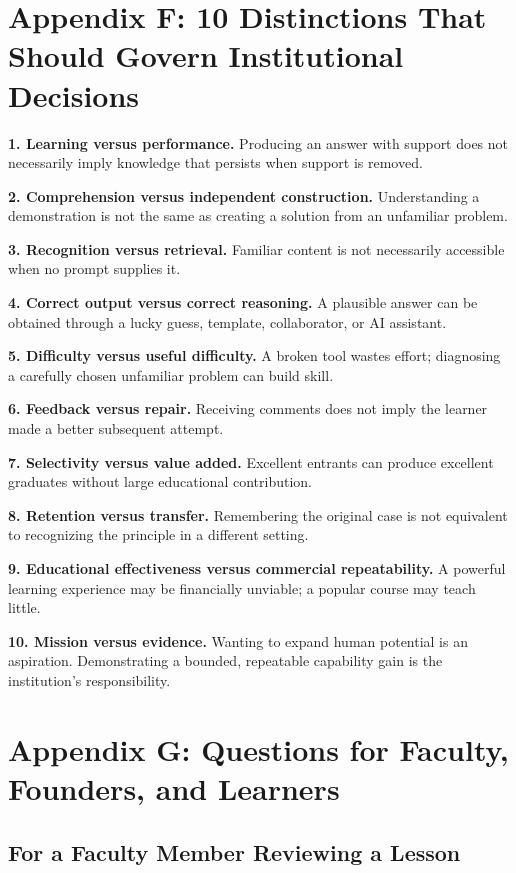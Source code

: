 \section*{Appendix F: 10 Distinctions That Should Govern Institutional Decisions}

\textbf{1. Learning versus performance.} Producing an answer with support does not necessarily imply knowledge that persists when support is removed.

\textbf{2. Comprehension versus independent construction.} Understanding a demonstration is not the same as creating a solution from an unfamiliar problem.

\textbf{3. Recognition versus retrieval.} Familiar content is not necessarily accessible when no prompt supplies it.

\textbf{4. Correct output versus correct reasoning.} A plausible answer can be obtained through a lucky guess, template, collaborator, or AI assistant.

\textbf{5. Difficulty versus useful difficulty.} A broken tool wastes effort; diagnosing a carefully chosen unfamiliar problem can build skill.

\textbf{6. Feedback versus repair.} Receiving comments does not imply the learner made a better subsequent attempt.

\textbf{7. Selectivity versus value added.} Excellent entrants can produce excellent graduates without large educational contribution.

\textbf{8. Retention versus transfer.} Remembering the original case is not equivalent to recognizing the principle in a different setting.

\textbf{9. Educational effectiveness versus commercial repeatability.} A powerful learning experience may be financially unviable; a popular course may teach little.

\textbf{10. Mission versus evidence.} Wanting to expand human potential is an aspiration. Demonstrating a bounded, repeatable capability gain is the institution's responsibility.

\section*{Appendix G: Questions for Faculty, Founders, and Learners}

\subsection*{For a Faculty Member Reviewing a Lesson}

